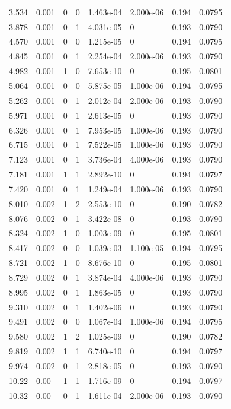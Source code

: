 \documentclass[preview]{standalone}
\begin{document}
{{\begin{tabular}{L{1.2cm}C{1.2cm} C{0.3cm}C{0.5cm} C{1.4cm}C{1.4cm} C{1.4cm}C{1.4cm}}
  3.534  &  0.001  & 0     &  0 &  1.463e-04  & 2.000e-06  & 0.194 &  0.0795   \\ 
  3.878  &  0.001  & 0     &  1 &  4.031e-05  & 0  & 0.193 &  0.0790   \\ 
  4.570  &  0.001  & 0     &  0 &  1.215e-05  & 0  & 0.194 &  0.0795   \\ 
  4.845  &  0.001  & 0     &  1 &  2.254e-04  & 2.000e-06  & 0.193 &  0.0790   \\ 
  4.982  &  0.001  & 1     &  0 &  7.653e-10  & 0  & 0.195 &  0.0801   \\ 
  5.064  &  0.001  & 0     &  0 &  5.875e-05  & 1.000e-06  & 0.194 &  0.0795   \\ 
  5.262  &  0.001  & 0     &  1 &  2.012e-04  & 2.000e-06  & 0.193 &  0.0790   \\ 
  5.971  &  0.001  & 0     &  1 &  2.613e-05  & 0  & 0.193 &  0.0790   \\ 
  6.326  &  0.001  & 0     &  1 &  7.953e-05  & 1.000e-06  & 0.193 &  0.0790   \\ 
  6.715  &  0.001  & 0     &  1 &  7.522e-05  & 1.000e-06  & 0.193 &  0.0790   \\ 
  7.123  &  0.001  & 0     &  1 &  3.736e-04  & 4.000e-06  & 0.193 &  0.0790   \\ 
  7.181  &  0.001  & 1     &  1 &  2.892e-10  & 0  & 0.194 &  0.0797   \\ 
  7.420  &  0.001  & 0     &  1 &  1.249e-04  & 1.000e-06  & 0.193 &  0.0790   \\ 
  8.010  &  0.002  & 1     &  2 &  2.553e-10  & 0  & 0.190 &  0.0782   \\ 
  8.076  &  0.002  & 0     &  1 &  3.422e-08  & 0  & 0.193 &  0.0790   \\ 
  8.324  &  0.002  & 1     &  0 &  1.003e-09  & 0  & 0.195 &  0.0801   \\ 
  8.417  &  0.002  & 0     &  0 &  1.039e-03  & 1.100e-05  & 0.194 &  0.0795   \\ 
  8.721  &  0.002  & 1     &  0 &  8.676e-10  & 0  & 0.195 &  0.0801   \\ 
  8.729  &  0.002  & 0     &  1 &  3.874e-04  & 4.000e-06  & 0.193 &  0.0790   \\ 
  8.995  &  0.002  & 0     &  1 &  1.863e-05  & 0  & 0.193 &  0.0790   \\ 
  9.310  &  0.002  & 0     &  1 &  1.402e-06  & 0  & 0.193 &  0.0790   \\ 
  9.491  &  0.002  & 0     &  0 &  1.067e-04  & 1.000e-06  & 0.194 &  0.0795   \\ 
  9.580  &  0.002  & 1     &  2 &  1.025e-09  & 0  & 0.190 &  0.0782   \\ 
  9.819  &  0.002  & 1     &  1 &  6.740e-10  & 0  & 0.194 &  0.0797   \\ 
  9.974  &  0.002  & 0     &  1 &  2.818e-05  & 0  & 0.193 &  0.0790   \\ 
  10.22  &  0.00  & 1     &  1 &  1.716e-09  & 0  & 0.194 &  0.0797   \\ 
  10.32  &  0.00  & 0     &  1 &  1.611e-04  & 2.000e-06  & 0.193 &  0.0790   \\ 
\hline 
\end{tabular} 

}}
\end{document}
